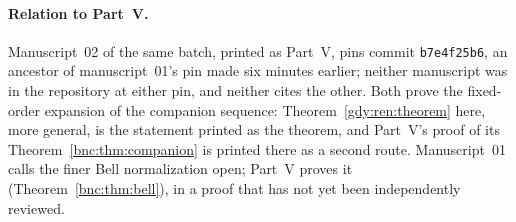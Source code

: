 \documentclass[11pt]{article}
\numberwithin{equation}{section}
\theoremstyle{definition}
\theoremstyle{remark}
\begin{document}
\paragraph{Relation to Part~V.}
Manuscript~02 of the same batch, printed as Part~V, pins commit
\texttt{b7e4f25b6}, an ancestor of manuscript~01's pin made six minutes
earlier; neither manuscript was in the repository at either pin, and
neither cites the other. Both prove the fixed-order expansion of the
companion sequence: Theorem~\ref{gdy:ren:theorem} here, more general, is
the statement printed as the theorem, and Part~V's proof of its
Theorem~\ref{bnc:thm:companion} is printed there as a second route.
Manuscript~01 calls the finer Bell normalization open; Part~V proves it
(Theorem~\ref{bnc:thm:bell}), in a proof that has not yet been
independently reviewed.
\end{document}
